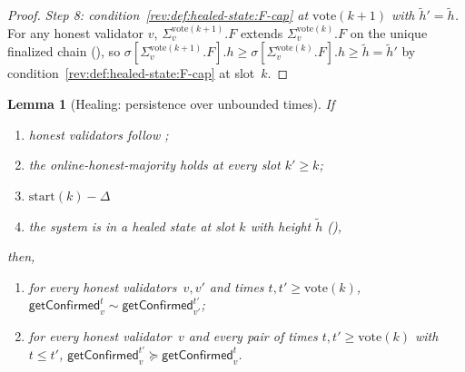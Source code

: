 \documentclass{article}
\newcommand{\start}{\ensuremath{\mathrm{start}}}
\newcommand{\vote}{\ensuremath{\mathrm{vote}}}
\newcommand{\comm}[1]{\ensuremath{\widetilde{#1}}}
\newcommand{\getConfirmed}{\textsf{getConfirmed}\xspace}
\theoremstyle{plain}
\newtheorem{lemma}{Lemma}
\theoremstyle{definition}
\theoremstyle{remark}
\begin{document}
\begin{proof}
\emph{Step 8: condition~\ref{rev:def:healed-state:F-cap} at $\vote(k{+}1)$ with $\comm{h}' = \comm{h}$.}
For any honest validator $v$, $\Sigma_v^{\vote(k+1)}.F$ extends $\Sigma_v^{\vote(k)}.F$ on the unique finalized chain (), so $\sigma[\Sigma_v^{\vote(k+1)}.F].h \geq \sigma[\Sigma_v^{\vote(k)}.F].h \geq \comm{h} = \comm{h}'$ by condition~\ref{rev:def:healed-state:F-cap} at slot~$k$.
\end{proof}

\begin{lemma}[Healing: persistence over unbounded times]\label{rev:lem:healing-unbounded}
If
\begin{enumerate}
  \item\label{rev:hu:f} honest validators follow ;
  \item\label{rev:hu:ohm} the online-honest-majority holds at every slot $k' \geq k$;
  \item\label{rev:hu:sync} $\start(k) - \Delta$
  \item\label{rev:hu:hs} the system is in a healed state at slot $k$ with height $\comm{h}$ (),
\end{enumerate}
then,
\begin{enumerate}
  \item for every honest validators~$v,v'$ and times $t, t' \geq \vote(k)$, $\getConfirmed_v^{t} \sim \getConfirmed_{v'}^{t'}$;
  \item for every honest validator~$v$ and every pair of times $t, t' \geq \vote(k)$ with $t \leq t'$, $\getConfirmed_v^{t'} \succeq \getConfirmed_v^t$.
\end{enumerate}
\end{lemma}
\end{document}
